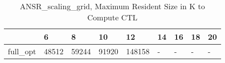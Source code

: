 \begin{table}
\caption{ANSR\_scaling\_grid, Maximum Resident Size in K to Compute CTL}
\label{ANSR_scaling_grid_CTL_size}
\begin{tabular}{lllllllll}
\toprule
 & 6 & 8 & 10 & 12 & 14 & 16 & 18 & 20 \\
\midrule
full\_opt & 48512 & 59244 & 91920 & 148158 & - & - & - & - \\
\bottomrule
\end{tabular}
\end{table}
